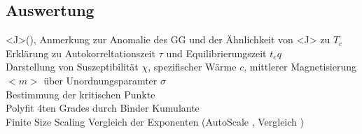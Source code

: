 \subsection{Auswertung}
    <J>(\sigma), Anmerkung zur Anomalie des GG und der Ähnlichkeit von <J> zu \(T_c\)\\

    Erklärung zu Autokorreltationszeit \(\tau\) und Equilibrierungszeit \(t_eq\)\\
    Darstellung von Suszeptibilität \(\chi\), spezifischer Wärme \(c\), mittlerer Magnetisierung \(<m>\) über Unordnungsparamter \(\sigma\)\\
    Bestimmung der kritischen Punkte\\
        Polyfit 4ten Grades durch Binder Kumulante \cite{Binder1981}\\
        Finite Size Scaling Vergleich der Exponenten (AutoScale \cite{Melchert2009}, Vergleich \cite[S. 59]{Pelissetto2002})\\
